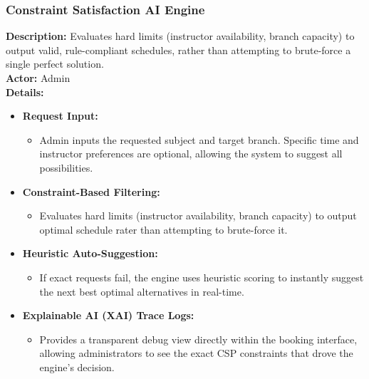 \subsubsection{Constraint Satisfaction AI Engine}
\textbf{Description:} Evaluates hard limits (instructor availability, branch capacity) to output valid, rule-compliant schedules, rather than attempting to brute-force a single perfect solution. \\
\textbf{Actor:} Admin \\
\textbf{Details:}
\begin{itemize}
    \item \textbf{Request Input:}
    \begin{itemize}
        \item Admin inputs the requested subject and target branch. Specific time and instructor preferences are optional, allowing the system to suggest all possibilities.
    \end{itemize}
    
    \item \textbf{Constraint-Based Filtering:}
    \begin{itemize}
        \item Evaluates hard limits (instructor availability, branch capacity) to output optimal schedule rater than attempting to brute-force it.
    \end{itemize}
    
    \item \textbf{Heuristic Auto-Suggestion:}
    \begin{itemize}
        \item If exact requests fail, the engine uses heuristic scoring to instantly suggest the next best optimal alternatives in real-time.
    \end{itemize}

    \item \textbf{Explainable AI (XAI) Trace Logs:}
    \begin{itemize}
        \item Provides a transparent debug view directly within the booking interface, allowing administrators to see the exact CSP constraints that drove the engine's decision.
    \end{itemize}

\end{itemize}

